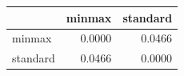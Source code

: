 \begin{tabular}{lrr}
\toprule
 & minmax & standard \\
\midrule
minmax & 0.0000 & 0.0466 \\
standard & 0.0466 & 0.0000 \\
\bottomrule
\end{tabular}
